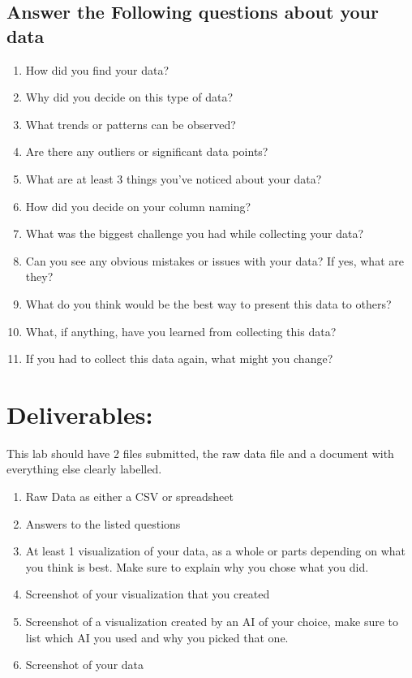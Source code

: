 \documentclass[12pt]{article}
\begin{document}
\subsection*{Answer the Following questions about your data}
    \begin{enumerate}
        \item How did you find your data?
        \item Why did you decide on this type of data?
        \item What trends or patterns can be observed?
        \item Are there any outliers or significant data points?
        \item What are at least 3 things you've noticed about your data? 
        \item How did you decide on your column naming?
        \item What was the biggest challenge you had while collecting your data?
        \item Can you see any obvious mistakes or issues with your data? If yes, what are they?
        \item What do you think would be the best way to present this data to others? 
        \item What, if anything, have you learned from collecting this data?
        \item If you had to collect this data again, what might you change?
    \end{enumerate}





\section*{Deliverables:}
This lab should have 2 files submitted, the raw data file and a document with everything else clearly labelled. 
\begin{enumerate}
    \item Raw Data as either a CSV or spreadsheet
    \item Answers to the listed questions
    \item At least 1 visualization of your data, as a whole or parts depending on what you think is best.  Make sure to explain why you chose what you did. 
    \item Screenshot of your visualization that you created
    \item Screenshot of a visualization created by an AI of your choice, make sure to list which AI you used and why you picked that one.
    \item Screenshot of your data
\end{enumerate}
\end{document}
